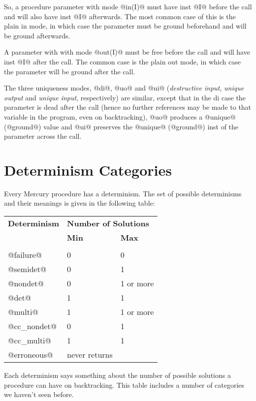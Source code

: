 So, a procedure parameter with mode @in(I)@ must have inst @I@
before the call and will also have inst @I@ afterwards.  The
most common case of this is the plain in mode, in which
case the parameter must be ground beforehand and will be
ground afterwards.

A parameter with with mode @out(I)@ must be free before the
call and will have inst @I@ after the call.  The common case
is the plain out mode, in which case the parameter will
be ground after the call.

The three uniqueness modes, @di@, @uo@ and @ui@ (\emph{destructive
input}, \emph{unique output} and \emph{unique input}, respectively)
are similar, except that in the di case the parameter is
dead after the call (hence no further references may be
made to that variable in the program, even on
backtracking), @uo@ produces a @unique@ (@ground@) value and @ui@
preserves the @unique@ (@ground@) inst of the parameter across
the call.

\section{Determinism Categories}

Every Mercury procedure has a determinism.  The set of
possible determinisms and their meanings is given in the
following table:

\begin{tabular}{lll}
\textbf{Determinism} & \multicolumn{2}{l}{\textbf{Number of Solutions}} \\
                     & \textbf{Min} & \textbf{Max} \\
\hline \\
@failure@            & 0            & 0 \\
@semidet@            & 0            & 1 \\
@nondet@             & 0            & 1 or more \\
@det@                & 1            & 1 \\
@multi@              & 1            & 1 or more \\
@cc_nondet@          & 0            & 1 \\
@cc_multi@           & 1            & 1 \\
@erroneous@          & never returns \\
\end{tabular}

Each determinism says something about the number of possible
solutions a procedure can have on backtracking.  This table
includes a number of categories we haven't seen before.

